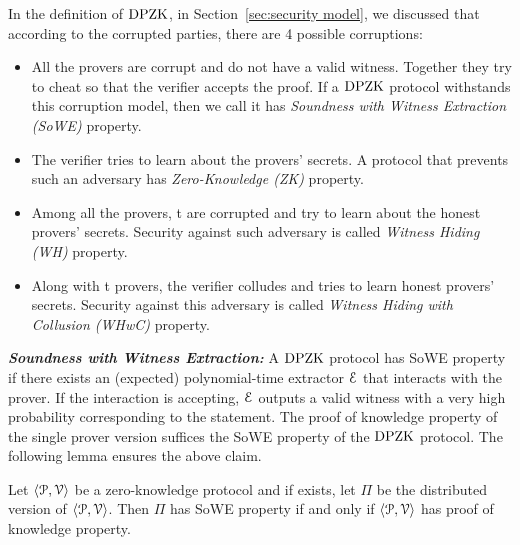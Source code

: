 In the definition of $\text{DPZK}$, in Section~\ref{sec:security model}, we discussed that according to the corrupted parties, there are 4 possible corruptions:
\begin{itemize}
	\item All the provers are corrupt and do not have a valid witness. Together they try to cheat so that the verifier accepts the proof. If a $\text{DPZK}$ protocol withstands this corruption model, then we call it has {\em Soundness with Witness Extraction (SoWE)} property.
	\item The verifier tries to learn about the provers' secrets. A protocol that prevents such an adversary has {\em Zero-Knowledge (ZK)} property.
	\item Among all the provers, t are corrupted and try to learn about the honest provers' secrets. Security against such adversary is called {\em Witness Hiding (WH)} property.
	\item Along with t provers, the verifier colludes and tries to learn honest provers' secrets. Security against this adversary is called {\em Witness Hiding with Collusion (WHwC)} property.
\end{itemize}
\noindent\textit{\textbf{Soundness with Witness Extraction:}} A $\text{DPZK}$ protocol has {SoWE} property if there exists an (expected) polynomial-time extractor $\mathcal{E}$ that interacts with the prover. If the interaction is accepting, $\mathcal{E}$ outputs a valid witness with a very high probability corresponding to the statement. 
The proof of knowledge property of the single prover version suffices the {SoWE} property of the $\text{DPZK}$ protocol. The following lemma ensures the above claim.
\begin{lemma}\label{lem:SoWE}
	Let $\langle \mathcal{P},\mathcal{V}\rangle$ be a zero-knowledge protocol and if exists, let $\Pi$ be the distributed version of $\langle \mathcal{P},\mathcal{V}\rangle$. Then $\Pi$ has SoWE property if and only if $\langle \mathcal{P},\mathcal{V}\rangle$ has proof of knowledge property.
\end{lemma} 
